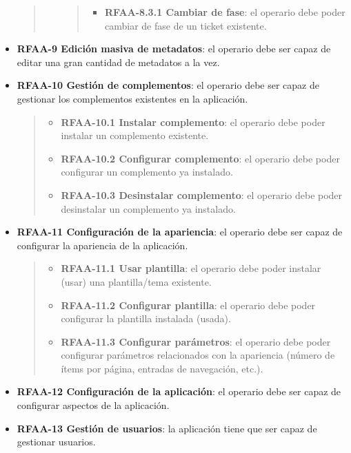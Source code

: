 \begin{itemize}
\begin{quote}
\begin{itemize}
    \begin{quote}
    \begin{itemize}
    \tightlist
    \item
      \textbf{RFAA-8.3.1 Cambiar de fase}: el operario debe poder
      cambiar de fase de un ticket existente.
    \end{itemize}
    \end{quote}
  \end{itemize}
  \end{quote}
\item
  \textbf{RFAA-9 Edición masiva de metadatos}: el operario debe ser
  capaz de editar una gran cantidad de metadatos a la vez.
\item
  \textbf{RFAA-10 Gestión de complementos}: el operario debe ser capaz
  de gestionar los complementos existentes en la aplicación.

  \begin{quote}
  \begin{itemize}
  \tightlist
  \item
    \textbf{RFAA-10.1 Instalar complemento}: el operario debe poder
    instalar un complemento existente.
  \item
    \textbf{RFAA-10.2 Configurar complemento}: el operario debe poder
    configurar un complemento ya instalado.
  \item
    \textbf{RFAA-10.3 Desinstalar complemento}: el operario debe poder
    desinstalar un complemento ya instalado.
  \end{itemize}
  \end{quote}
\item
  \textbf{RFAA-11 Configuración de la apariencia}: el operario debe ser
  capaz de configurar la apariencia de la aplicación.

  \begin{quote}
  \begin{itemize}
  \tightlist
  \item
    \textbf{RFAA-11.1 Usar plantilla}: el operario debe poder instalar
    (usar) una plantilla/tema existente.
  \item
    \textbf{RFAA-11.2 Configurar plantilla}: el operario debe poder
    configurar la plantilla instalada (usada).
  \item
    \textbf{RFAA-11.3 Configurar parámetros}: el operario debe poder
    configurar parámetros relacionados con la apariencia (número de
    ítems por página, entradas de navegación, etc.).
  \end{itemize}
  \end{quote}
\item
  \textbf{RFAA-12 Configuración de la aplicación}: el operario debe ser
  capaz de configurar aspectos de la aplicación.
\item
  \textbf{RFAA-13 Gestión de usuarios}: la aplicación tiene que ser
  capaz de gestionar usuarios.


\end{itemize}
